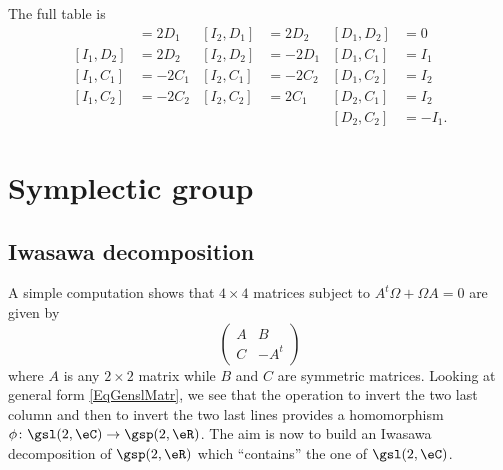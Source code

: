 The full table is
\begin{align}
	[I_1,D_1] & =2D_1  & [I_2,D_1] & =2D_2  & [D_1,D_2] & =0     \\
	[I_1,D_2] & =2D_2  & [I_2,D_2] & =-2D_1 & [D_1,C_1] & =I_1   \\
	[I_1,C_1] & =-2C_1 & [I_2,C_1] & =-2C_2 & [D_1,C_2] & =I_2   \\
	[I_1,C_2] & =-2C_2 & [I_2,C_2] & =2C_1  & [D_2,C_1] & =I_2   \\
	          &        &           &        & [D_2,C_2] & =-I_1.
\end{align}
\section{Symplectic group}		\label{SecSympleGp}

\subsection{Iwasawa decomposition}

A simple computation shows that $4\times 4$ matrices subject to $A^t\Omega+\Omega A=0$ are given by
\[
	\begin{pmatrix}
		A & B    \\
		C & -A^t
	\end{pmatrix}
\]
where $A$ is any $2\times 2$ matrix while $B$ and $C$ are symmetric matrices. Looking at general form \eqref{EqGenslMatr}, we see that the operation to invert the two last column and then to invert the two last lines provides a homomorphism $\phi\colon \gsl(2,\eC)\to \gsp(2,\eR)$. The aim is now to build an Iwasawa decomposition of $\gsp(2,\eR)$ which ``contains'' the one of $\gsl(2,\eC)$.

